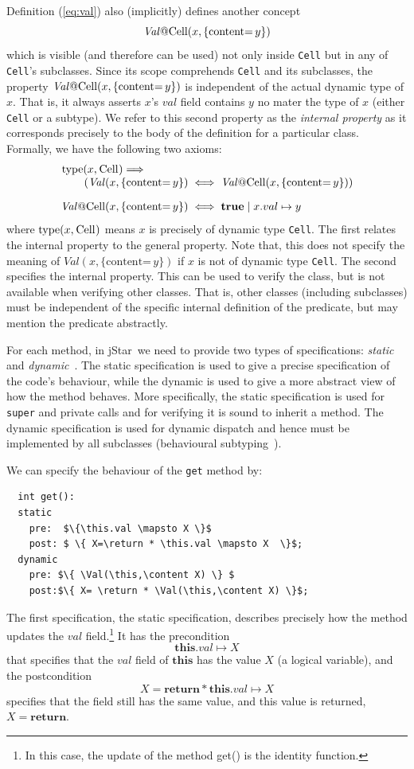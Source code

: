 \documentclass[11pt]{article}
\newcommand{\jStar}{{\sf jStar}}
\newcommand{\Val}{\mathit{Val}}
\newcommand{\content}[1]{\{\text{content=} \, #1 \}}
\newcommand{\true}{\mathbf{true}}
\newcommand{\symbolicheap}[2]{#1 \mid #2}
\newcommand{\this}{\mathbf{this}}
\newcommand{\return}{\mathbf{return}}
\def\J{\lstinline}
\newcommand{\JS}[1]{$\mathit{#1}$}
\begin{document}
Definition (\ref{eq:val}) also (implicitly) defines another concept 
\[
\Val\J~@Cell~(x,\content y)
\]
which  is visible (and therefore can be used) not only inside \J~Cell~ but in any of \J~Cell~'s subclasses.
Since its scope comprehends  \J~Cell~ and its subclasses, the property $\Val\J~@Cell~(x,\content y)$
is independent of the actual dynamic type of \JS{x}. That is, it always asserts \JS{x}'s
\JS{val} field contains \JS{y} no mater the type of \JS{x} (either \J~Cell~ or a subtype).  
We refer
to this second property as the \emph{internal property} as it
corresponds precisely to the body of the definition for a particular
class. Formally, we have the following two axioms:
\[
\begin{array}{@{}r@{\;}c@{\;}l@{}}
\begin{array}[b]{@{}l@{}}
\J~type~(x, \J~Cell~) \Longrightarrow \\
\mbox{}\qquad(\Val(x,\content y)
\end{array} & \iff & \Val\J~@Cell~(x,\content y))
\\[1em]
\Val\J~@Cell~(x,\content y) &\iff& \symbolicheap{\true}{ x.val \mapsto y}
\end{array}
\]
where $\J~type~(x, \J~Cell~)$ means $x$ is precisely of dynamic type
\J~Cell~.
%
The first relates the internal property to the general property.  Note
that, this does not specify the meaning of $\Val(x,\content y)$ if $x$
is not of dynamic type \J~Cell~.  The second specifies the internal
property.  This can be used to verify the class, but is not available
when verifying other classes.  That is, other classes (including
subclasses) must be independent of the specific internal definition of
the predicate, but may mention the predicate abstractly.



For each method, in \jStar \ we need to provide two types of specifications: {\em static}
and {\em dynamic}~\cite{PB08,chin08}.  The static specification is
used to give a precise specification of the code's behaviour, while the
dynamic is used to give a more abstract view of how the method
behaves.  More specifically, the static specification is used for
\J~super~ and private calls and for verifying it is sound to inherit a
method.  The dynamic specification is used for dynamic dispatch
and hence must be implemented by all subclasses (behavioural
subtyping~\cite{liskov94}).

We can  specify the behaviour of the \J~get~ method by:
\begin{lstlisting}
  int get():
  static
    pre:  $\{\this.val \mapsto X \}$
    post: $ \{ X=\return * \this.val \mapsto X  \}$;
  dynamic 
    pre: $\{ \Val(\this,\content X) \} $
    post:$\{ X= \return * \Val(\this,\content X) \}$;
\end{lstlisting}
%
The first specification, the static specification, describes precisely
how the method updates the \JS{val} field.\footnote{In this case, the
  update of the method get() is the identity function.}  It has the
precondition $$\this.val \mapsto X$$ that specifies that the \JS{val}
field of $\this$ has the value \JS{X} (a logical
variable), and
the postcondition $$X=\return * \this.val \mapsto X$$ specifies that the
field still has the same value, and this value is returned,
$X=\return$.
\end{document}
